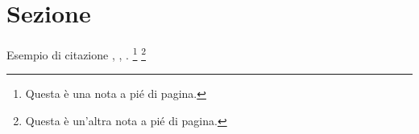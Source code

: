 \documentclass[twoside]{supsistudent}
\begin{document}
\section{Sezione}

\lipsum[23]
Esempio di citazione \cite{4538384}, \cite{5357331,4523385}, \cite{1705631}.
\footnote{Questa \`e una nota a pi\'e di pagina.}
\footnote{Questa \`e un'altra nota a pi\'e di pagina.}

%
%
%
%
%
%
%



\end{document}
